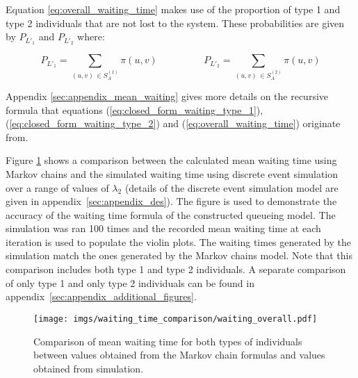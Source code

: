 Equation \ref{eq:overall_waiting_time} makes use of the proportion of type 1 
and type 2 individuals that are not lost to the system. These probabilities are 
given by \(P_{L'_1}\) and \(P_{L'_2}\) where:

\begin{equation}\label{eq:proportion_of_accepting_individuals}
    P_{L'_1} = \sum_{(u,v) \, \in S_A^{(1)}} \pi(u,v) \hspace{2cm}
    P_{L'_2} = \sum_{(u,v) \, \in S_A^{(2)}} \pi(u,v)
\end{equation}
 
Appendix \ref{sec:appendix_mean_waiting} gives more details on the recursive
formula that equations (\ref{eq:closed_form_waiting_type_1}),
(\ref{eq:closed_form_waiting_type_2}) and (\ref{eq:overall_waiting_time})
originate from. 

Figure \ref{fig:markov_vs_des_waiting_time_comparison_overall} shows a 
comparison between the calculated mean waiting time using Markov chains and the
simulated waiting time using discrete event simulation over a range of values of 
\(\lambda_2\) (details of the discrete event simulation model are given in 
appendix~\ref{sec:appendix_des}).
The figure is used to demonstrate the accuracy of the waiting time formula of
the constructed queueing model.
The simulation was ran 100 times and the recorded mean waiting time at each 
iteration is used to populate the violin plots.
The waiting times generated by the simulation match the ones generated by the 
Markov chains model.
Note that this comparison includes both type 1 and type 2 individuals.
A separate comparison of only type 1 and only type 2 individuals can be found 
in appendix~\ref{sec:appendix_additional_figures}.

\begin{figure}[H]
    \centering
    \texttt{[image: imgs/waiting\_time\_comparison/waiting\_overall.pdf]}
    \caption{
        Comparison of mean waiting time for both types of individuals between 
        values obtained from the Markov chain formulas and values obtained from 
        simulation.
    }
    \label{fig:markov_vs_des_waiting_time_comparison_overall}
\end{figure}
